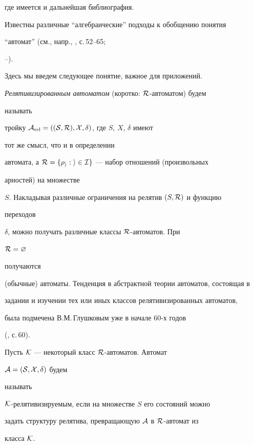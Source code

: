 где имеется и дальнейшая библиография.





Известны различные ``алгебраические'' подходы к обобщению понятия


``автомат'' (см., напр., \cite{Plo}, с.\,52--65;


\cite{Sko}--\cite{Chir}).


Здесь мы введем следующее понятие, важное для приложений.





{\em Релятивизированным автоматом} (коротко: $\cal R$-автоматом) будем


называть


тройку $\cal A_{\mathrm{rel}}=((S,\cal R),X,\delta)$, где $S$, $X$, $\delta$ имеют


тот же смысл, что и в определении


автомата, а $\cal R=\{\rho_i:i\in I\}$ --- набор отношений (произвольных


арностей) на множестве


$S$. Накладывая различные ограничения на релятив $(S,\cal R)$ и функцию


переходов


$\delta$, можно получать различные классы $\cal R$-автоматов. При


$\cal R=\varnothing$


получаются


(обычные) автоматы. Тенденция в абстрактной теории автоматов, состоящая в


задании и изучении тех или иных классов релятивизированных автоматов,


была подмечена В.М.\,Глушковым уже в начале 60-х годов


(\cite{Glu}, с.\,60).





Пусть $\cal K$ --- некоторый класс $\cal R$-автоматов. Автомат


$\cal A=(S,X,\delta)$ будем


называть


$\cal K$-релятивизируемым, если на множестве $S$ его состояний можно


задать структуру релятива, превращающую $\cal A$ в $\cal R$-автомат из


класса $\cal K$.





